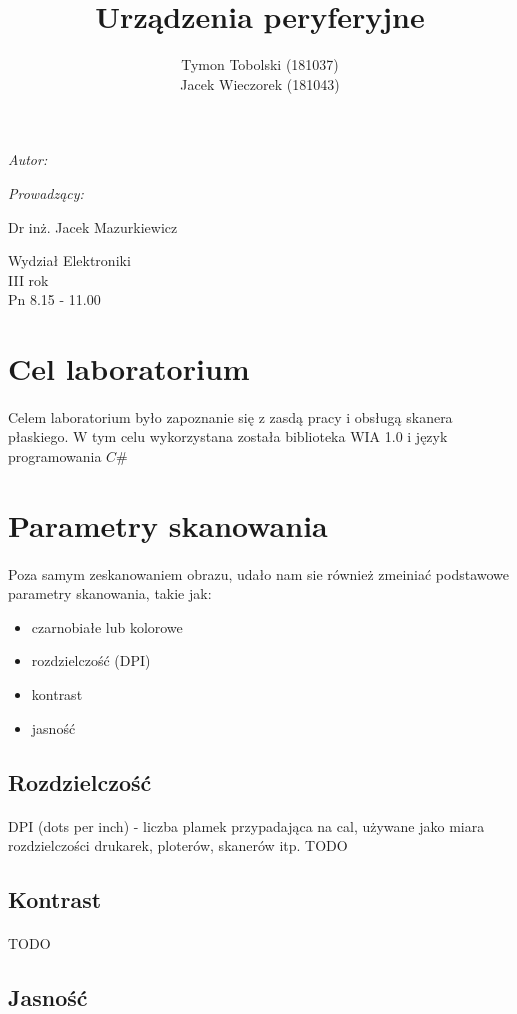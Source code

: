 \documentclass[wide,a4paper,titlepage,12pt] {article}
\title{Urządzenia peryferyjne}
\author{Tymon Tobolski (181037)\\ Jacek Wieczorek (181043)}
\makeatletter
\renewcommand{\maketitle}{
\begin{titlepage}
  \begin{center}
    \vspace*{3cm}
    \LARGE \@title \par
    \vspace{2cm}
    \textit{\small Autor:}\par
    \normalsize \@author\par \normalsize
    \vspace{3cm}
    \textit{\small Prowadzący:}\par
    Dr inż. Jacek Mazurkiewicz \par
    \vspace{2cm}
    Wydział Elektroniki\\ III rok\\ Pn 8.15 - 11.00\par
    \vspace{4cm}
    \small \@date
  \end{center}
\end{titlepage}
}
\makeatother
\begin{document}
\maketitle

\section{Cel laboratorium}
\paragraph{}
Celem laboratorium było zapoznanie się z zasdą pracy i obsługą skanera płaskiego. W tym celu wykorzystana została biblioteka WIA 1.0 i język programowania $C\#$

\section{Parametry skanowania}
\paragraph{} %
Poza samym zeskanowaniem obrazu, udało nam sie również zmeiniać podstawowe parametry skanowania, takie jak:
\begin{itemize}
    \item czarnobiałe lub kolorowe
    \item rozdzielczość (DPI)
    \item kontrast
    \item jasność
\end{itemize}

\subsection{Rozdzielczość}
\paragraph{}
DPI (dots per inch) - liczba plamek przypadająca na cal, używane jako miara rozdzielczości drukarek, ploterów, skanerów itp. 
TODO
\subsection{Kontrast}
\paragraph{} %
\label{par:}
TODO

\subsection{Jasność}
\end{document}
